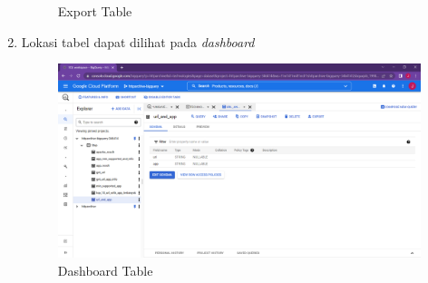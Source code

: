 \begin{enumerate}
\begin{figure}[H]
		\caption{Export Table} 
		\label{fig:export_table}
	\end{figure}
	\item Lokasi tabel dapat dilihat pada \textit{dashboard}
		\begin{figure}[H]
		\centering  
		\includegraphics[scale=0.35]{Gambar/saved dashboard.PNG}  
		\caption{Dashboard Table} 
		\label{fig:lokasi_table}
	\end{figure}
\end{enumerate}

